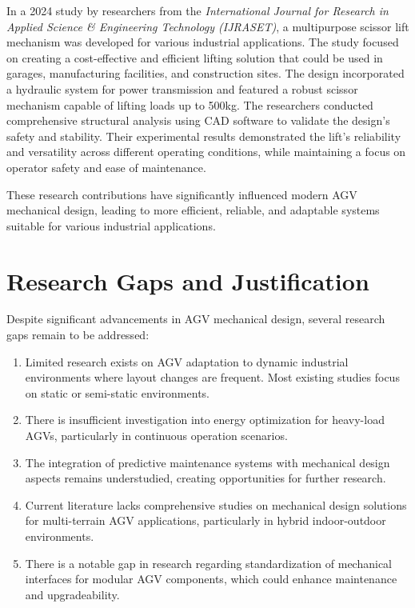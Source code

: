 \documentclass[../../main]{subfiles}
\begin{document}
In a 2024 study by researchers from the \textit{International Journal for Research in Applied Science \& Engineering Technology (IJRASET)}, a multipurpose scissor lift mechanism was developed for various industrial applications. The study focused on creating a cost-effective and efficient lifting solution that could be used in garages, manufacturing facilities, and construction sites. The design incorporated a hydraulic system for power transmission and featured a robust scissor mechanism capable of lifting loads up to 500kg. The researchers conducted comprehensive structural analysis using CAD software to validate the design's safety and stability. Their experimental results demonstrated the lift's reliability and versatility across different operating conditions, while maintaining a focus on operator safety and ease of maintenance.

These research contributions have significantly influenced modern AGV mechanical design, leading to more efficient, reliable, and adaptable systems suitable for various industrial applications.
\newpage

\section{Research Gaps and Justification}
Despite significant advancements in AGV mechanical design, several
research gaps remain to be addressed:

\begin{enumerate}
\item
  Limited research exists on AGV adaptation to dynamic industrial
  environments where layout changes are frequent. Most existing studies
  focus on static or semi-static environments.
\item
  There is insufficient investigation into energy optimization for
  heavy-load AGVs, particularly in continuous operation scenarios.
\item
  The integration of predictive maintenance systems with mechanical
  design aspects remains understudied, creating opportunities for
  further research.
\item
  Current literature lacks comprehensive studies on mechanical design
  solutions for multi-terrain AGV applications, particularly in hybrid
  indoor-outdoor environments.
\item
  There is a notable gap in research regarding standardization of
  mechanical interfaces for modular AGV components, which could enhance
  maintenance and upgradeability.
\end{enumerate}
\end{document}
